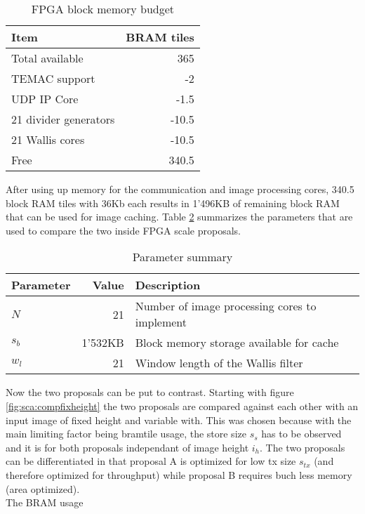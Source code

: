 \begin{table}[h!]
    \centering
    \begin{tabular}{l r}
        \toprule
        Item & BRAM tiles \\
        \midrule
        Total available & 365 \\
        TEMAC support & -2 \\
        UDP IP Core & -1.5 \\
        21 divider generators & -10.5 \\
        21 Wallis cores & -10.5 \\
        \midrule
        Free & 340.5\\
        \bottomrule
    \end{tabular}
    \caption{FPGA block memory budget}
    \label{tab:membudget}
\end{table}

After using up memory for the communication and image processing cores, 340.5
block RAM tiles with 36Kb each results in 1'496KB of remaining block RAM that
can be used for image caching. Table \ref{tab:parsum} summarizes the
parameters that are used to compare the two inside FPGA scale proposals.

\begin{table}[h!]
    \centering
    \begin{tabular}{l r l}
        \toprule
        Parameter & Value & Description\\
        \midrule
        $N$ & 21 & Number of image processing cores to implement \\
        $s_b$ & 1'532KB & Block memory storage available for cache \\
        $w_l$ & 21 & Window length of the Wallis filter \\
        \bottomrule
    \end{tabular}
    \caption{Parameter summary}
    \label{tab:parsum}
\end{table}

Now the two proposals can be put to contrast. Starting with figure 
\ref{fig:sca:compfixheight} the two proposals are compared against each other
with an input image of fixed height and variable with. This was chosen because
with the main limiting factor being \gls{bramtile} usage, the store size $s_s$ has to
be observed and it is for both proposals independant of image height $i_h$. The
two proposals can be differentiated in that proposal A is optimized for low tx
size $s_{tx}$ (and therefore optimized for throughput) while proposal B requires
buch less memory (area optimized). 
\\
The BRAM usage 


